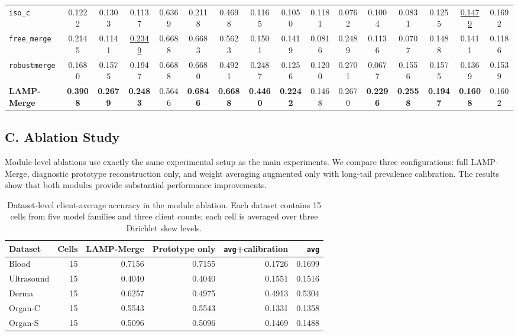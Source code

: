 \documentclass[letterpaper]{article} %
\begin{document}
\begin{table}[t]
{\begin{tabular}{lccccccccccccccc}
\texttt{iso\_c} & 0.1222 & 0.1303 & 0.1137 & 0.6369 & 0.2118 & 0.4698 & 0.1165 & 0.1050 & 0.1181 & 0.0762 & 0.1004 & 0.0831 & 0.1255 & \underline{0.1479} & 0.1692 \\
\texttt{free\_merge} & 0.2145 & 0.1141 & \underline{0.2349} & 0.6688 & 0.6683 & 0.5623 & 0.1501 & 0.1419 & 0.0816 & 0.2489 & 0.1136 & 0.0707 & 0.1488 & 0.1411 & 0.1186 \\
\texttt{robustmerge} & 0.1680 & 0.1575 & 0.1947 & 0.6688 & 0.6680 & 0.4921 & 0.2487 & 0.1256 & 0.1200 & 0.2701 & 0.0677 & 0.1556 & 0.1575 & 0.1369 & 0.1539 \\
\textbf{LAMP-Merge} & \textbf{0.3908} & \textbf{0.2679} & \textbf{0.2483} & 0.5646 & \textbf{0.6846} & \textbf{0.6688} & \textbf{0.4460} & \textbf{0.2242} & 0.1468 & 0.2670 & \textbf{0.2296} & \textbf{0.2558} & \textbf{0.1947} & \textbf{0.1608} & 0.1602 \\
\hline
\end{tabular}
}
\end{table}


\subsection{C. Ablation Study}

Module-level ablations use exactly the same experimental setup as the main experiments. We compare three configurations: full LAMP-Merge, diagnostic prototype reconstruction only, and weight averaging augmented only with long-tail prevalence calibration. The results show that both modules provide substantial performance improvements.

\begin{table}[t]
\centering
\caption{Dataset-level client-average accuracy in the module ablation. Each dataset contains 15 cells from five model families and three client counts; each cell is averaged over three Dirichlet skew levels.}
\label{tab:dataset-ablation-acc}
\scriptsize
\setlength{\tabcolsep}{3.0pt}
\begin{tabular}{lrrrrr}
\hline
Dataset & Cells & LAMP-Merge & Prototype only & \texttt{avg}+calibration & \texttt{avg} \\
\hline
Blood & 15 & 0.7156 & 0.7155 & 0.1726 & 0.1699 \\
Ultrasound & 15 & 0.4040 & 0.4040 & 0.1551 & 0.1516 \\
Derma & 15 & 0.6257 & 0.4975 & 0.4913 & 0.5304 \\
Organ-C & 15 & 0.5543 & 0.5543 & 0.1331 & 0.1358 \\
Organ-S & 15 & 0.5096 & 0.5096 & 0.1469 & 0.1488 \\
\hline
\end{tabular}
\end{table}
\end{document}
